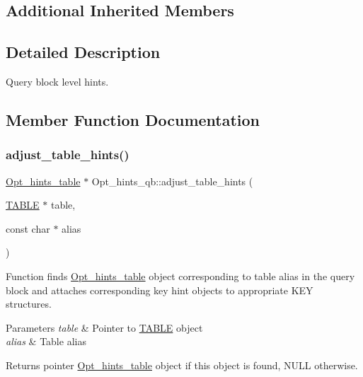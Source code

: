 \subsection*{Additional Inherited Members}


\subsection{Detailed Description}
Query block level hints. 

\subsection{Member Function Documentation}
\mbox{\label{classOpt__hints__qb_a393fe013d9b0ddea680a3321bc139851}} 
\subsubsection{\texorpdfstring{adjust\+\_\+table\+\_\+hints()}{adjust\_table\_hints()}}
{\footnotesize\ttfamily \mbox{\hyperlink{classOpt__hints__table}{Opt\+\_\+hints\+\_\+table}} $\ast$ Opt\+\_\+hints\+\_\+qb\+::adjust\+\_\+table\+\_\+hints (\begin{DoxyParamCaption}\item[{\mbox{\hyperlink{structTABLE}{T\+A\+B\+LE}} $\ast$}]{table,  }\item[{const char $\ast$}]{alias }\end{DoxyParamCaption})}

Function finds \mbox{\hyperlink{classOpt__hints__table}{Opt\+\_\+hints\+\_\+table}} object corresponding to table alias in the query block and attaches corresponding key hint objects to appropriate K\+EY structures.


\begin{DoxyParams}{Parameters}
{\em table} & Pointer to \mbox{\hyperlink{structTABLE}{T\+A\+B\+LE}} object \\
\hline
{\em alias} & Table alias\\
\hline
\end{DoxyParams}
\begin{DoxyReturn}{Returns}
pointer \mbox{\hyperlink{classOpt__hints__table}{Opt\+\_\+hints\+\_\+table}} object if this object is found, N\+U\+LL otherwise. 
\end{DoxyReturn}
\mbox{\label{classOpt__hints__qb_af4f0b581f86642fce87816546656efb7}} 
